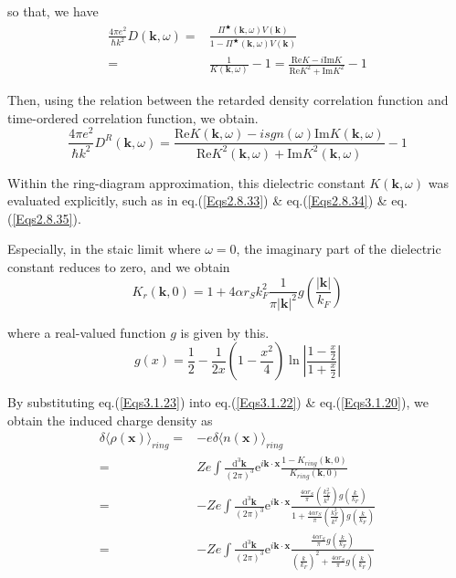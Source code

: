 so that, we have
\begin{equation} \label{Eqs3.1.21} \begin{split}
\frac{4\pi e^2}{\hbar k^2} D(\mathbf{k},\omega) =& \frac{\Pi^\bigstar(\mathbf{k},\omega)V(\mathbf{k})}{1-\Pi^\bigstar(\mathbf{k},\omega)V(\mathbf{k})}\\
=& \frac{1}{K(\mathbf{k},\omega)}-1 = \frac{\text{Re} K -i \text{Im} K}{ \text{Re} K^2 + \text{Im} K^2} - 1
\end{split}\end{equation}

Then, using the relation between the retarded density correlation function and time-ordered correlation function, we obtain.
\begin{equation} \label{Eqs3.1.22}
\frac{4\pi e^2}{\hbar k^2} D^R(\mathbf{k},\omega) = \frac{\text{Re} K(\mathbf{k},\omega) - i sgn(\omega) \text{Im} K(\mathbf{k},\omega)}{\text{Re} K^2(\mathbf{k},\omega) + \text{Im} K^2(\mathbf{k},\omega)} - 1
\end{equation}

Within the ring-diagram approximation, this dielectric constant $K(\mathbf{k},\omega)$ was evaluated explicitly, such as in eq.(\ref{Eqs2.8.33}) \& eq.(\ref{Eqs2.8.34}) \& eq.(\ref{Eqs2.8.35}).

Especially, in the staic limit where $\omega=0$, the imaginary part of the dielectric constant reduces to zero, and we obtain
\begin{equation} \label{Eqs3.1.23}
K_r(\mathbf{k},0) = 1+ 4 \alpha r_S k_F^2 \frac{1}{\pi |\mathbf{k}|^2} g\left( \frac{|\mathbf{k}|}{k_F} \right)
\end{equation}

where a real-valued function $g$ is given by this.
\begin{equation} \label{Eqs3.1.24}
g(x) = \frac{1}{2} - \frac{1}{2x}\left( 1-\frac{x^2}{4} \right) \ln \left| \frac{1-\frac{x}{2}}{1+\frac{x}{2}} \right|
\end{equation}

By substituting eq.(\ref{Eqs3.1.23}) into eq.(\ref{Eqs3.1.22}) \& eq.(\ref{Eqs3.1.20}), we obtain the induced charge density as
\[ \begin{split}
\delta\langle \rho(\mathbf{x}) \rangle_{ring} =& - e \delta\langle n(\mathbf{x}) \rangle_{ring}\\
=& Z e \int \frac{\mathrm{d}^3 \mathbf{k}}{(2\pi)^3} \mathrm{e}^{i \mathbf{k} \cdot \mathbf{x}}\frac{1-K_{ring}(\mathbf{k},0)}{K_{ring}(\mathbf{k},0)}\\
=&-Z e \int \frac{\mathrm{d}^3 \mathbf{k}}{(2\pi)^3} \mathrm{e}^{i \mathbf{k} \cdot \mathbf{x}}\frac{\frac{4\alpha r_S}{\pi}\left( \frac{k_F^2}{k^2} \right)g\left( \frac{k}{k_F} \right)}{1+\frac{4\alpha r_S}{\pi}\left( \frac{k_F^2}{k^2} \right)g\left( \frac{k}{k_F} \right)}\\
=&-Z e \int \frac{\mathrm{d}^3 \mathbf{k}}{(2\pi)^3} \mathrm{e}^{i \mathbf{k} \cdot \mathbf{x}}\frac{\frac{4\alpha r_S}{\pi}g\left( \frac{k}{k_F} \right)}{\left( \frac{k}{k_F} \right)^2+\frac{4\alpha r_S}{\pi}g\left( \frac{k}{k_F} \right)}
\end{split} \]

